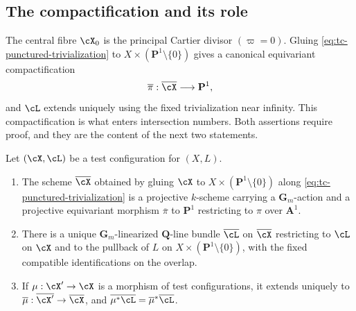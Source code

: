\subsection{The compactification and its role}
\label{sec:ch33-compactification}

The central fibre $\cX_0$ is the principal Cartier divisor
$(\varpi=0)$.  Gluing \eqref{eq:tc-punctured-trivialization} to
$X\times(\mathbf P^1\setminus\{0\})$ gives a canonical equivariant
compactification
\begin{equation}
\label{eq:tc-compactification}
              \overline\pi:\overline\cX\longrightarrow\mathbf P^1,
\end{equation}
and $\cL$ extends uniquely using the fixed trivialization near infinity.
This compactification is what enters intersection numbers.  Both assertions
require proof, and they are the content of the next two statements.

\begin{theorem}
\label{thm:ch33-compactification}
Let $(\cX,\cL)$ be a test configuration for $(X,L)$.
\begin{enumerate}
\item The scheme $\overline\cX$ obtained by gluing $\cX$ to
 $X\times(\mathbf P^1\setminus\{0\})$ along
 \eqref{eq:tc-punctured-trivialization} is a projective
 $k$-scheme carrying a $\mathbf G_m$-action and a projective
 equivariant morphism $\overline\pi$ to $\mathbf P^1$ restricting to
 $\pi$ over $\mathbf A^1$.
\item There is a unique $\mathbf G_m$-linearized $\mathbf Q$-line bundle
 $\overline\cL$ on $\overline\cX$ restricting to $\cL$ on $\cX$ and
 to the pullback of $L$ on $X\times(\mathbf P^1\setminus\{0\})$, with the fixed compatible
 identifications on the overlap.
\item If $\mu:\cX'\to\cX$ is a morphism of test configurations, it extends
 uniquely to $\overline\mu:\overline{\cX'}\to\overline\cX$, and
 $\overline{\mu^\ast\cL}=\overline\mu^\ast\overline\cL$.
\end{enumerate}
\end{theorem}

